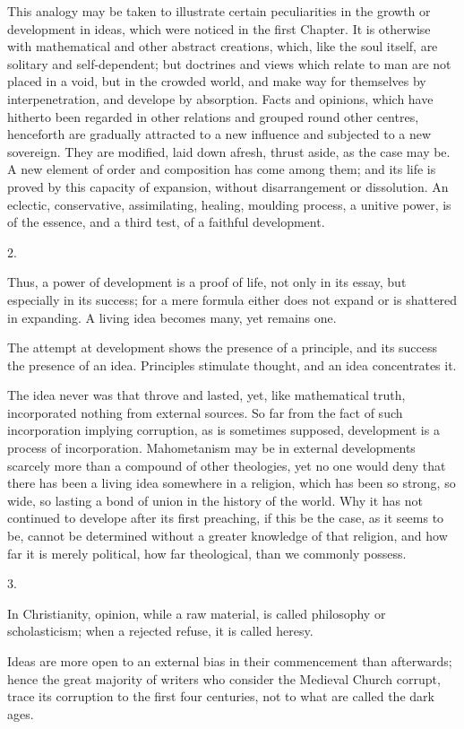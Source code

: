 This analogy may be taken to illustrate certain
peculiarities in the growth or development in ideas,
which were noticed in the first Chapter. It is otherwise
with mathematical and other abstract creations, which,
like the soul itself, are solitary and self-dependent;
but doctrines and views which relate to man are not
placed in a void, but in the crowded world, and make way
for themselves by interpenetration, and develope by
absorption. Facts and opinions, which have hitherto been
regarded in other relations and grouped round other
centres, henceforth are gradually attracted to a new
influence and subjected to a new sovereign. They are
modified, laid down afresh, thrust aside, as the case may
be. A new element of order and composition has come among
them; and its life is proved by this capacity of
expansion, without disarrangement or dissolution. An
eclectic, conservative, assimilating, healing, moulding
process, a unitive power, is of the essence, and a third
test, of a faithful development.

2.

Thus, a power of development is a proof of life, not
only in its essay, but especially in its success; for a
mere formula either does not expand or is shattered in
expanding. A living idea becomes many, yet remains one.

The attempt at development shows the presence of a
principle, and its success the presence of an idea.
Principles stimulate thought, and an idea concentrates
it.

The idea never was that throve and lasted, yet, like
mathematical truth, incorporated nothing from external
sources. So far from the fact of such incorporation
implying corruption, as is sometimes supposed,
development is a process of incorporation. Mahometanism
may be in external developments scarcely more than a
compound of other theologies, yet no one would deny that
there has been a living idea somewhere in a religion,
which has been so strong, so wide, so lasting a bond of
union in the history of the world. Why it has not
continued to develope after its first preaching, if this
be the case, as it seems to be, cannot be determined
without a greater knowledge of that religion, and how far
it is merely political, how far theological, than we
commonly possess.

3.

In Christianity, opinion, while a raw material, is
called philosophy or scholasticism; when a rejected
refuse, it is called heresy.

Ideas are more open to an external bias in their
commencement than afterwards; hence the great majority of
writers who consider the Medieval Church corrupt, trace
its corruption to the first four centuries, not to what
are called the dark ages.

